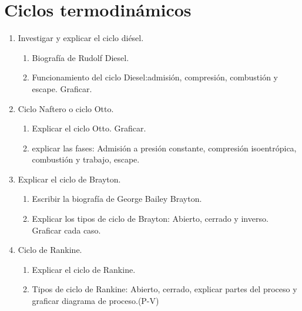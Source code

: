\documentclass[../main]{subfiles}
\begin{document}
\chapter{Ciclos termodinámicos}
\begin{enumerate}
  \item Investigar y explicar el ciclo diésel.
    \begin{enumerate}
      \item Biografía de Rudolf Diesel.
      \item Funcionamiento del ciclo Diesel:admisión, compresión,
        combustión y escape. Graficar.
    \end{enumerate}
  \item Ciclo Naftero o ciclo Otto.
    \begin{enumerate}
      \item Explicar el ciclo Otto. Graficar.
      \item explicar las fases: Admisión a presión constante,
        compresión isoentrópica, combustión y trabajo, escape.
    \end{enumerate}
  \item Explicar el ciclo de Brayton.
    \begin{enumerate}
      \item Escribir la biografía de George Bailey Brayton.
      \item Explicar los tipos de ciclo de Brayton: Abierto, cerrado
        y inverso. Graficar cada caso.
    \end{enumerate}
  \item Ciclo de Rankine.
    \begin{enumerate}
      \item Explicar el ciclo de Rankine.
      \item Tipos de ciclo de Rankine: Abierto, cerrado, explicar
        partes del proceso y graficar diagrama de proceso.(P-V)
    \end{enumerate}
\end{enumerate}
\end{document}
